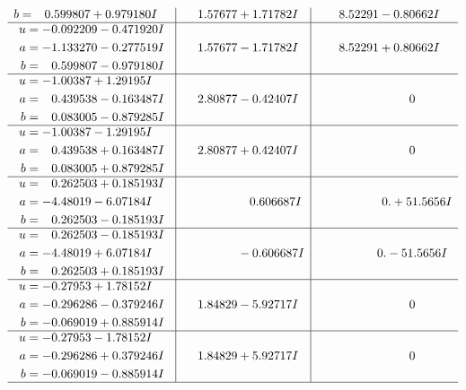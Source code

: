 \documentclass[1p]{elsarticle_modified}
\theoremstyle{definition}
\begin{document}
$$\begin{array}{c|c|c}
\begin{aligned}
b &= \phantom{-}0.599807 + 0.979180 I\end{aligned}
 & \phantom{-}1.57677 + 1.71782 I & \phantom{-}8.52291 - 0.80662 I \\ \hline\begin{aligned}
u &= -0.092209 - 0.471920 I \\
a &= -1.133270 - 0.277519 I \\
b &= \phantom{-}0.599807 - 0.979180 I\end{aligned}
 & \phantom{-}1.57677 - 1.71782 I & \phantom{-}8.52291 + 0.80662 I \\ \hline\begin{aligned}
u &= -1.00387 + 1.29195 I \\
a &= \phantom{-}0.439538 - 0.163487 I \\
b &= \phantom{-}0.083005 - 0.879285 I\end{aligned}
 & \phantom{-}2.80877 - 0.42407 I & \phantom{-0.000000 } 0 \\ \hline\begin{aligned}
u &= -1.00387 - 1.29195 I \\
a &= \phantom{-}0.439538 + 0.163487 I \\
b &= \phantom{-}0.083005 + 0.879285 I\end{aligned}
 & \phantom{-}2.80877 + 0.42407 I & \phantom{-0.000000 } 0 \\ \hline\begin{aligned}
u &= \phantom{-}0.262503 + 0.185193 I \\
a &= -4.48019 - 6.07184 I \\
b &= \phantom{-}0.262503 - 0.185193 I\end{aligned}
 & \phantom{-0.000000 -}0.606687 I & \phantom{-0.000000 -}0. + 51.5656 I \\ \hline\begin{aligned}
u &= \phantom{-}0.262503 - 0.185193 I \\
a &= -4.48019 + 6.07184 I \\
b &= \phantom{-}0.262503 + 0.185193 I\end{aligned}
 & \phantom{-0.000000 } -0.606687 I & \phantom{-0.000000 } 0. - 51.5656 I \\ \hline\begin{aligned}
u &= -0.27953 + 1.78152 I \\
a &= -0.296286 - 0.379246 I \\
b &= -0.069019 + 0.885914 I\end{aligned}
 & \phantom{-}1.84829 - 5.92717 I & \phantom{-0.000000 } 0 \\ \hline\begin{aligned}
u &= -0.27953 - 1.78152 I \\
a &= -0.296286 + 0.379246 I \\
b &= -0.069019 - 0.885914 I\end{aligned}
 & \phantom{-}1.84829 + 5.92717 I & \phantom{-0.000000 } 0\\
 \hline 
 \end{array}$$\newpage\newpage\renewcommand{\arraystretch}{1}
\end{document}
